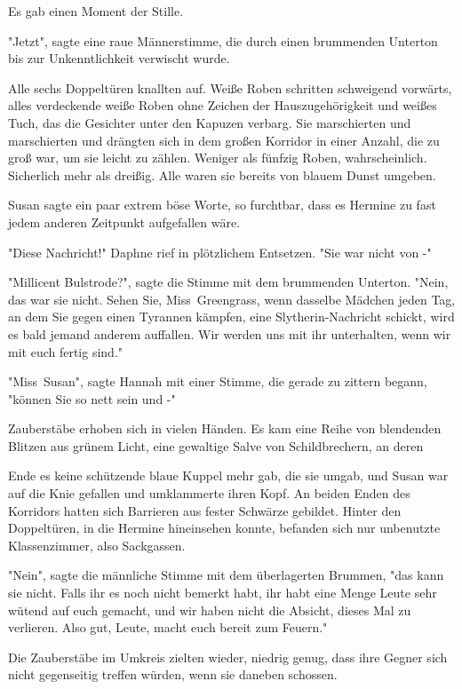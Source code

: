 {Es gab einen Moment der Stille.

"Jetzt", sagte eine raue Männerstimme, die durch einen brummenden Unterton bis zur Unkenntlichkeit verwischt wurde.

Alle sechs Doppeltüren knallten auf. Weiße Roben schritten schweigend vorwärts, alles verdeckende weiße Roben ohne Zeichen der Hauszugehörigkeit und weißes Tuch, das die Gesichter unter den Kapuzen verbarg. Sie marschierten und marschierten und drängten sich in dem großen Korridor in einer Anzahl, die zu groß war, um sie leicht zu zählen. Weniger als fünfzig Roben, wahrscheinlich. Sicherlich mehr als dreißig. Alle waren sie bereits von blauem Dunst umgeben.

Susan sagte ein paar extrem böse Worte, so furchtbar, dass es Hermine zu fast jedem anderen Zeitpunkt aufgefallen wäre.

"Diese Nachricht!" Daphne rief in plötzlichem Entsetzen. "Sie war nicht von -"

"Millicent Bulstrode?", sagte die Stimme mit dem brummenden Unterton. "Nein, das war sie nicht. Sehen Sie, Miss~Greengrass, wenn dasselbe Mädchen jeden Tag, an dem Sie gegen einen Tyrannen kämpfen, eine Slytherin-Nachricht schickt, wird es bald jemand anderem auffallen. Wir werden uns mit ihr unterhalten, wenn wir mit euch fertig sind."

"Miss~Susan", sagte Hannah mit einer Stimme, die gerade zu zittern begann, "können Sie so nett sein und -"

Zauberstäbe erhoben sich in vielen Händen. Es kam eine Reihe von blendenden Blitzen aus grünem Licht, eine gewaltige Salve von Schildbrechern, an deren

Ende es keine schützende blaue Kuppel mehr gab, die sie umgab, und Susan war auf die Knie gefallen und umklammerte ihren Kopf. An beiden Enden des Korridors hatten sich Barrieren aus fester Schwärze gebildet. Hinter den Doppeltüren, in die Hermine hineinsehen konnte, befanden sich nur unbenutzte Klassenzimmer, also Sackgassen.

"Nein", sagte die männliche Stimme mit dem überlagerten Brummen, "das kann sie nicht. Falls ihr es noch nicht bemerkt habt, ihr habt eine Menge Leute sehr wütend auf euch gemacht, und wir haben nicht die Absicht, dieses Mal zu verlieren. Also gut, Leute, macht euch bereit zum Feuern."

Die Zauberstäbe im Umkreis zielten wieder, niedrig genug, dass ihre Gegner sich nicht gegenseitig treffen würden, wenn sie daneben schossen.

}
